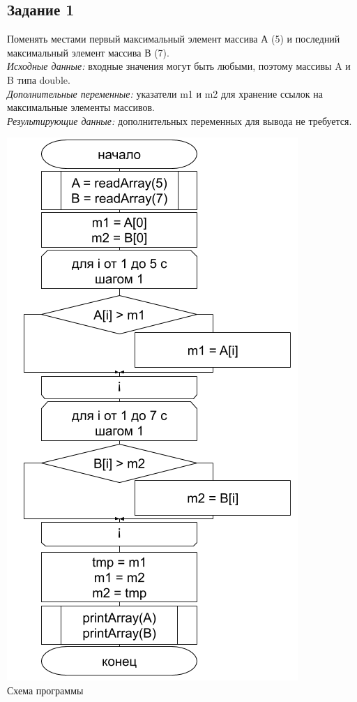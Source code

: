 \documentclass[a4paper,14pt]{extarticle}
\begin{document}
\subsection{Задание 1}
Поменять местами первый максимальный элемент массива А (5) и последний максимальный элемент массива В (7).\\
\textit{Исходные данные:} входные значения могут быть любыми, поэтому массивы A и B типа double.\\
\textit{Дополнительные переменные:} указатели m1 и m2 для хранение ссылок на максимальные элементы массивов.\\
\textit{Результирующие данные:} дополнительных переменных для вывода не требуется.\\
\begin{center}
\includegraphics[scale=0.6]{lab5-1.png}\\
Схема программы
\end{center}
\end{document}
